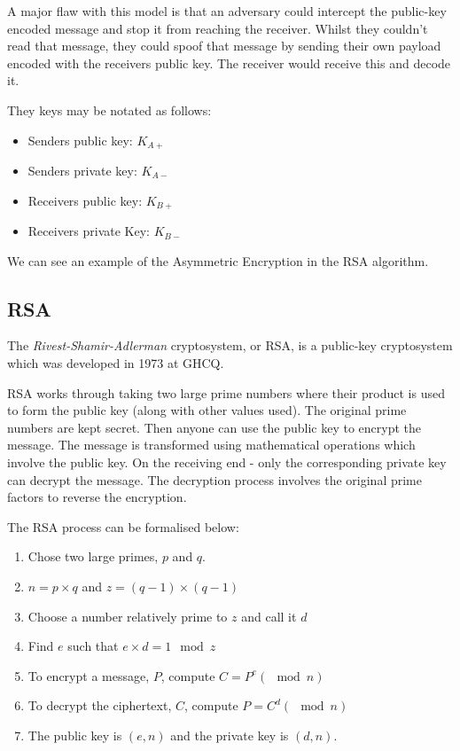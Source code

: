 A major flaw with this model is that an adversary could intercept the public-key encoded message and stop it from reaching the receiver. Whilst they couldn't read that message, they could spoof that message by sending their own payload encoded with the receivers public key. The receiver would receive this and decode it. 

They keys may be notated as follows:
\begin{itemize}
    \item Senders public key: $K_{A+}$
    \item Senders private key: $K_{A-}$
    \item Receivers public key: $K_{B+}$
    \item Receivers private Key: $K_{B-}$
\end{itemize}

We can see an example of the Asymmetric Encryption in the RSA algorithm. 

\subsection{RSA}
The \textit{Rivest-Shamir-Adlerman} cryptosystem, or RSA, is a public-key cryptosystem which was developed in 1973 at GHCQ. 

RSA works through taking two large prime numbers where their product is used to form the public key (along with other values used). The original prime numbers are kept secret. Then anyone can use the public key to encrypt the message. The message is transformed using mathematical operations which involve the public key. On the receiving end - only the corresponding private key can decrypt the message. The decryption process involves the original prime factors to reverse the encryption.

The RSA process can be formalised below:
\begin{enumerate}
    \item Chose two large primes, $p$ and $q$.
    \item $n=p\times q$ and $z=(q-1) \times (q-1)$
    \item Choose a number relatively prime to $z$ and call it $d$
    \item Find $e$ such that $e \times d = 1 \mod z$
    \item To encrypt a message, $P$, compute $C=P^e(\mod n)$
    \item To decrypt the ciphertext, $C$, compute $P=C^d(\mod n)$
    \item The public key is $(e, n)$ and the private key is $(d, n)$.
\end{enumerate}

